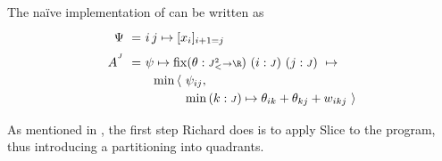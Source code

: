 \begin{example}

\noindent
The na\"ive implementation of 
can be written as
%
\newcommand\Jsquaredltsml{J^2_{\mbox{\fontsize{6}{6}\selectfont \hspace{.5pt}<}}}
\begin{equation}
  \renewcommand\arraystretch{1.2}
  \begin{array}{@{}r@{}l@{}}
    \Psi ~=~ & i\,j\mapsto
	           [x_i]_{i+1=j} \\[2mm]
%
    A^{^{J}} ~=~ 
	      & \psi\mapsto \fix 
	        \htyped{\theta}{\Jsquaredltsml\to\R}~ \htyped{i}{J} ~ \htyped{j}{J}
	        ~\mapsto \\
	      &
          ~~
	      \begin{array}{@{}l@{}l@{}} 
	        \min\,\langle~ & \psi_{ij}, \\
	         & \min\, \htyped k J \mapsto\theta_{ik}+\theta_{kj}+w_{ikj}
	        ~\rangle
	      \end{array}
  \end{array}
  \label{tactics:paren phase A}
\end{equation}


As mentioned in , the first step Richard does is to apply
{\sf Slice} to the program, thus introducing a partitioning into quadrants.

\smallskip


\end{example}

